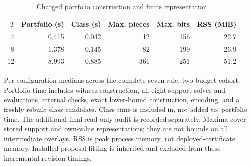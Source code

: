 \begin{table}[htbp]
\centering\footnotesize
\caption{Charged portfolio construction and finite representation}\label{tab:global-work}
\begin{tabular}{rrrrrr}\toprule
$T$ & Portfolio (s) & Class (s) & Max. pieces & Max. bits & RSS (MiB) \\\midrule
4 & 0.415 & 0.042 & 12 & 156 & 22.7 \\
8 & 1.378 & 0.145 & 82 & 199 & 26.9 \\
12 & 8.993 & 0.885 & 361 & 251 & 51.2 \\
\bottomrule\end{tabular}
\par\smallskip\begin{minipage}{.98\textwidth}\footnotesize Per-configuration medians across the complete seven-rule, two-budget cohort. Portfolio time includes witness construction, all eight support solves and evaluations, internal checks, exact lower-bound construction, encoding, and a freshly rebuilt class candidate. Class time is included in, not added to, portfolio time. The additional final read-only audit is recorded separately. Maxima cover stored support and own-value representations; they are not bounds on all intermediate overlays. RSS is peak process memory, not deployed-certificate memory. Installed proposal fitting is inherited and excluded from these incremental revision timings.\end{minipage}
\end{table}
